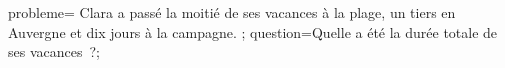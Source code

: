 \documentclass[exercice]{thedocument}%
\begin{document}
%
    \>probleme={%
    Clara a passé la moitié de ses vacances à la plage,
    un tiers en Auvergne et dix jours à la campagne.
    };%
    \>question=Quelle a été la durée totale de ses vacances~?;%
\end{document}
